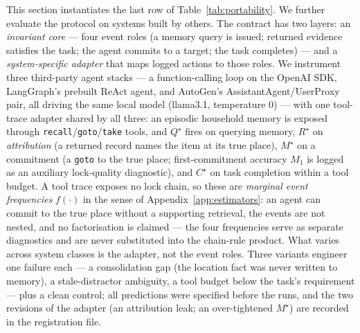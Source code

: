 \documentclass{article}
\newcommand{\method}[1]{\texttt{#1}}
\begin{document}
This section instantiates the last row of
Table~\ref{tab:portability}. We further evaluate the protocol on
systems built by others. The contract has two layers: an \emph{invariant core} --- four event
roles (a memory query is issued; returned evidence satisfies the
task; the agent commits to a target; the task completes) --- and a
\emph{system-specific adapter} that maps logged actions to those
roles. We instrument three third-party agent stacks --- a
function-calling loop on the OpenAI SDK, LangGraph's prebuilt ReAct
agent, and AutoGen's AssistantAgent/UserProxy pair, all driving the
same local model (llama3.1, temperature $0$) --- with one tool-trace
adapter shared by all three: an episodic household memory is exposed
through \method{recall}/\method{goto}/\method{take} tools, and
$Q^\star$ fires on querying memory, $R^\star$ on \emph{attribution}
(a returned record names the item at its true place), $M^\star$ on a
commitment (a \method{goto} to the true place; first-commitment
accuracy $M_1$ is logged as an auxiliary lock-quality diagnostic),
and $C^\star$ on task completion within a tool budget. A tool trace
exposes no lock chain, so these are \emph{marginal event frequencies}
$f(\cdot)$ in the sense of Appendix~\ref{app:estimators}: an agent
can commit to the true place without a supporting retrieval, the
events are not nested, and no factorisation is claimed --- the four
frequencies serve as separate diagnostics and are never substituted
into the chain-rule product. What varies across system
classes is the adapter, not the event roles. Three variants engineer
one failure each --- a consolidation gap (the location fact was never
written to memory), a stale-distractor ambiguity, a tool budget below
the task's requirement --- plus a clean control; all predictions were
specified before the runs, and the two revisions of the adapter (an
attribution leak; an over-tightened $M^\star$) are recorded in the
registration file.
\end{document}
